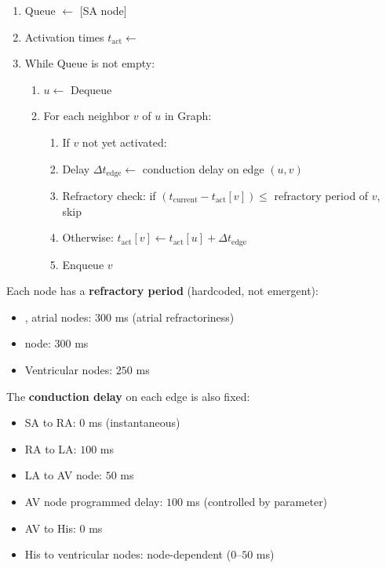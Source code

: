 \documentclass[12pt,a4paper,oneside]{book}
\begin{document}
\begin{algorithm}
    \caption{Activation Propagation (BFS)}
    \begin{enumerate}
        \item Queue $\leftarrow$ [SA node]
        \item Activation times $t_{\text{act}} \leftarrow$ {}
        \item While Queue is not empty:
        \begin{enumerate}
            \item $u \leftarrow$ Dequeue
            \item For each neighbor $v$ of $u$ in Graph:
            \begin{enumerate}
                \item If $v$ not yet activated:
                \item Delay $\Delta t_{\text{edge}} \leftarrow$ conduction delay on edge $(u,v)$
                \item Refractory check: if $(t_{\text{current}} - t_{\text{act}}[v]) \le$ refractory period of $v$, skip
                \item Otherwise: $t_{\text{act}}[v] \leftarrow t_{\text{act}}[u] + \Delta t_{\text{edge}}$
                \item Enqueue $v$
            \end{enumerate}
        \end{enumerate}
    \end{enumerate}
\end{algorithm}

Each node has a \textbf{refractory period} (hardcoded, not emergent):

\begin{itemize}
    \item \sa, atrial nodes: $300$ ms (atrial refractoriness)
    \item \av node: $300$ ms
    \item Ventricular nodes: $250$ ms
\end{itemize}

The \textbf{conduction delay} on each edge is also fixed:

\begin{itemize}
    \item SA to RA: $0$ ms (instantaneous)
    \item RA to LA: $100$ ms
    \item LA to AV node: $50$ ms
    \item AV node programmed delay: $100$ ms (controlled by parameter)
    \item AV to His: $0$ ms
    \item His to ventricular nodes: node-dependent ($0$--$50$ ms)
\end{itemize}
\end{document}
